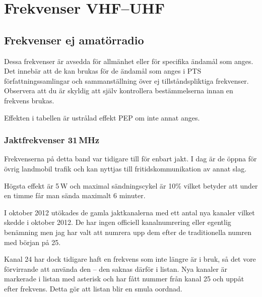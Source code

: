\section{Frekvenser VHF--UHF}

\subsection{Frekvenser ej amatörradio}

Dessa frekvenser är avsedda för allmänhet eller för specifika ända\-mål som anges. Det innebär att de kan brukas för de ändamål som anges i PTS för\-fatt\-nings\-sam\-ling\-ar och sammanställning över ej tillståndspliktiga frekvenser. Observera att du är skyldig att själv kontrollera bestämmelserna
innan en frekvens brukas.

Effekten i tabellen är ustrålad effekt PEP om inte annat anges.

\subsubsection{Jaktfrekvenser 31\,MHz}

Frekvenserna på detta band var tidigare till för enbart jakt. I dag är de öppna för övrig landmobil trafik och kan nyttjas till fritidskommunikation av annat slag.

Högsta effekt är 5\,W och maximal sändningscykel är 10\% vilket betyder att under en timme får man sända maximalt 6 minuter. 

I oktober 2012 utökades de gamla jaktkanalerna med ett antal nya kanaler vilket skedde i oktober 2012. De har ingen officiell kanalnumrering eller egentlig benämning men jag har valt att numrera upp dem efter de traditionella numren med början på 25.

Kanal 24 har dock tidigare haft en frekvens som inte längre är i bruk, så det vore förvirrande att använda den -- den saknas därför i listan. 
Nya kanaler är markerade i listan med asterisk och har fått nummer från kanal 25 och uppåt efter frekvens. Detta gör att listan blir en smula oordnad.

